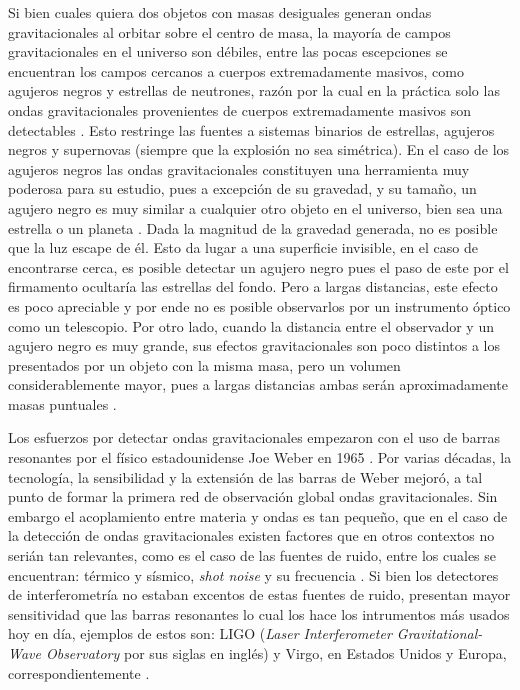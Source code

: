 	Si bien cuales quiera dos objetos con masas desiguales generan ondas gravitacionales al orbitar sobre el centro de masa, la mayor\'ia de campos gravitacionales en el universo son d\'ebiles, entre las pocas escepciones se encuentran los campos cercanos a cuerpos extremadamente masivos, como agujeros negros y estrellas de neutrones, raz\'on por la cual	en la pr\'actica solo las ondas gravitacionales provenientes de cuerpos extremadamente masivos son detectables \cite{straumann2012general}. Esto restringe las fuentes a sistemas binarios de estrellas, agujeros negros y supernovas (siempre que la explosi\'on no sea sim\'etrica). En el caso de los agujeros negros las ondas gravitacionales constituyen una herramienta muy poderosa para su estudio, pues a excepción de su gravedad, y su tamaño, un agujero negro es muy similar a cualquier otro objeto en el universo, bien sea una estrella o un planeta \cite{meier2012black}. Dada la magnitud de la gravedad generada, no es posible que la luz escape de él. Esto da lugar a una superficie invisible, en el caso de encontrarse cerca, es posible detectar un agujero negro pues el paso de este por el firmamento ocultar\'ia las estrellas del fondo. Pero a largas distancias, este efecto es poco apreciable y por ende no es posible observarlos por un instrumento \'optico como un telescopio. Por otro lado, cuando la distancia entre el observador y un agujero negro es muy grande, sus efectos gravitacionales son poco distintos a los presentados por un objeto con la misma masa, pero un volumen considerablemente mayor, pues a largas distancias ambas serán aproximadamente masas puntuales \cite{meier2012black}.
	
	Los esfuerzos por detectar ondas gravitacionales empezaron con el uso de barras resonantes por el f\'isico estadounidense Joe Weber en 1965 \cite{weber1967gravitational, bassan2014advanced}. Por varias d\'ecadas, la tecnolog\'ia, la sensibilidad y la extensi\'on de las barras de Weber mejor\'o, a tal punto de formar la primera red de observaci\'on global ondas gravitacionales. Sin embargo el acoplamiento entre materia y ondas es tan peque\~no, que en el caso de la detecci\'on de ondas gravitacionales existen factores que en otros contextos no seri\'an tan relevantes, como es el caso de las fuentes de ruido, entre los cuales se encuentran: t\'ermico y s\'ismico, \textit{shot noise} y su frecuencia \cite{bassan2014advanced}. Si bien los detectores de interferometr\'ia no estaban excentos de estas fuentes de ruido, presentan mayor sensitividad que las barras resonantes lo cual los hace los intrumentos m\'as usados hoy en d\'ia, ejemplos de estos son: LIGO (\textit{Laser Interferometer Gravitational-Wave Observatory} por sus siglas en ingl\'es) y Virgo, en Estados Unidos y Europa, correspondientemente \cite{abbott2009ligo, acernese2008status, bassan2014advanced}.
	

